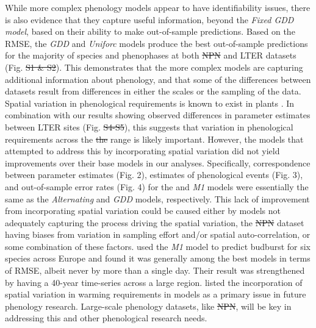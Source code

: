 \documentclass[fleqn,12pt,lineno]{article}
\providecommand{\DIFadd}[1]{{\protect\color{blue}\uwave{#1}}} %
\providecommand{\DIFdel}[1]{{\protect\color{red}\sout{#1}}}                      %
\providecommand{\DIFaddbegin}{} %
\providecommand{\DIFaddend}{} %
\providecommand{\DIFdelbegin}{} %
\providecommand{\DIFdelend}{} %
\begin{document}
While more complex phenology models appear to have identifiability issues, there is also evidence that they capture useful information, beyond the \textit{Fixed GDD model}, based on their ability to make out-of-sample predictions. Based on the RMSE, the \textit{GDD} and \textit{Uniforc} models produce the best out-of-sample predictions for the majority of species and phenophases at both \DIFdelbegin \DIFdel{NPN }\DIFdelend \DIFaddbegin \DIFadd{USA-NPN }\DIFaddend and LTER datasets (Fig. \DIFdelbegin \DIFdel{S1 \& S2}\DIFdelend \DIFaddbegin \DIFadd{S5 \& S6}\DIFaddend ). This demonstrates that the more complex models are capturing additional information about phenology, and that some of the differences between datasets result from differences in either the scales or the sampling of the data. Spatial variation in phenological requirements is known to exist in plants \citep{zhang2017}. In combination with our results showing observed differences in parameter estimates between LTER sites (Fig. \DIFdelbegin \DIFdel{S4-S5}\DIFdelend \DIFaddbegin \DIFadd{S8-S9}\DIFaddend ), this suggests that variation in phenological requirements across the \DIFdelbegin \DIFdel{the }\DIFdelend range is likely important. However, the models that attempted to address this by incorporating spatial variation did not yield improvements over their base models in our analyses. Specifically, correspondence between parameter estimates (Fig. 2), estimates of phenological events (Fig. 3), and out-of-sample error rates (Fig. 4) for the  and \textit{M1} models were essentially the same as the \textit{Alternating} and \textit{GDD} models, respectively. This lack of improvement from incorporating spatial variation could be caused either by models not adequately capturing the process driving the spatial variation, the \DIFdelbegin \DIFdel{NPN }\DIFdelend \DIFaddbegin \DIFadd{USA-NPN }\DIFaddend dataset having biases from variation in sampling effort and/or spatial auto-correlation, or some combination of these factors. \cite{basler2016} used the \textit{M1} model to predict budburst for six species across Europe and found it was generally among the best models in terms of RMSE, albeit never by more than a single day. Their result was strengthened by having a 40-year time-series across a large region. \cite{chuine2017} listed the incorporation of spatial variation in warming requirements in models as a primary issue in future phenology research. Large-scale phenology datasets, like \DIFdelbegin \DIFdel{NPN}\DIFdelend \DIFaddbegin \DIFadd{USA-NPN}\DIFaddend , will be key in addressing this and other phenological research needs.
\end{document}
